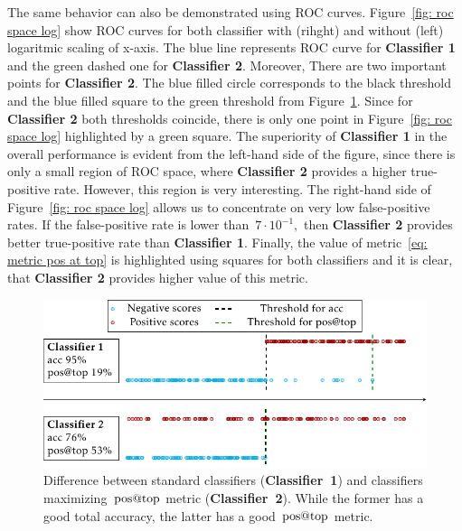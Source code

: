 The same behavior can also be demonstrated using ROC curves. Figure~\ref{fig: roc space log} show ROC curves for both classifier with (rihght) and without (left) logaritmic scaling of x-axis. The blue line represents ROC curve for \textbf{Classifier 1} and the green dashed one for \textbf{Classifier 2}. Moreover, There are two important points for \textbf{Classifier 2}. The blue filled circle corresponds to the black threshold and the blue filled square to the green threshold from Figure~\ref{fig: standard vs. aatp}. Since for \textbf{Classifier 2} both thresholds coincide, there is only one point in Figure~\ref{fig: roc space log} highlighted by a green square. The superiority of \textbf{Classifier 1} in the overall performance is evident from the left-hand side of the figure, since there is only a small region of ROC space, where \textbf{Classifier 2} provides a higher true-positive rate. However, this region is very interesting. The right-hand side of Figure~\ref{fig: roc space log} allows us to concentrate on very low false-positive rates. 
If the false-positive rate is lower than~$7 \cdot 10^{-1},$ then \textbf{Classifier 2} provides better true-positive rate than \textbf{Classifier 1}. Finally, the value of metric~\eqref{eq: metric pos at top} is highlighted using squares for both classifiers and it is clear, that \textbf{Classifier 2} provides higher value of this metric.

\begin{figure}
  \centering
  \includegraphics{images/standard_aatp_comparison.pdf}
  \caption{Difference between standard classifiers (\textbf{Classifier~1}) and classifiers maximizing~$\operatorname{pos@top}$ metric (\textbf{Classifier~2}). While the former has a good total accuracy, the latter has a good~$\operatorname{pos@top}$ metric.}
  \label{fig: standard vs. aatp}
\end{figure}

